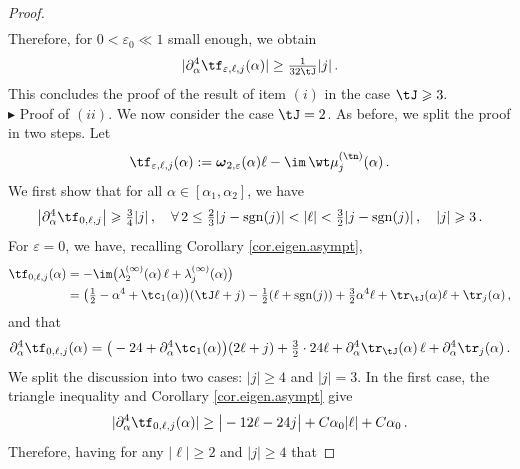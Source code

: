 \documentclass[a4paper,reqno,10pt]{article}
\newcommand{\pa}{\partial}
\newcommand{\bomega}{{\boldsymbol{\omega}}}
\begin{document}
\begin{proof}
\begin{align}
		\end{align}
	Therefore, for  $0< \varepsilon_{0} \ll 1$ small enough, we obtain 
    $$
    |\pa_{\alpha}^4\tf_{\varepsilon,\ell,j}(\alpha)|\geq\tfrac{1}{32 \tJ}|j| \,.
    $$
    This concludes the proof of the result of item $(i)$ in the case $\tJ\geqslant3.$
    \\[1mm]
    \noindent $\blacktriangleright$ {\sc Proof of $(ii)$.}
We now consider the case $\tJ=2$. As before, we split the proof in two steps. Let
\begin{equation}\label{fj-alpha-2}
     \tf_{\varepsilon,\ell,j}(\alpha) := \bomega_{2,\varepsilon}(\alpha) \ell -\im \, \wt\mu_{j}^{(\tn)}(\alpha) \,.
	\end{equation}
We first show that for all $\alpha\in [\alpha_{1},\alpha_{2}]$, we have
    \begin{equation}\label{transv.unpert-2}
        \big| \pa_{\alpha}^4 \tf_{0,\ell,j} \big| \geqslant \tfrac34  |j|
		\,, \quad  \forall \,2 \leq \tfrac23|j-{\rm{sgn}}(j)|< |\ell|< \tfrac32 |j-{\rm sgn}(j)|\,,\quad |j|\geqslant3 \,. 
	\end{equation}
For $\varepsilon=0$, we have, recalling Corollary \ref{cor.eigen.asympt},
	\begin{align}
			\tf_{0,\ell,j}(\alpha) & = -\im\big( \lambda_2^{(\infty)}(\alpha)\,\ell + \lambda_{j}^{(\infty)}(\alpha)\big) \\
			& =	\big(\tfrac12 - \alpha^4+\tc_{1}(\alpha) \big)(\tJ \ell + j) - \tfrac12 (\ell +{\rm sgn}(j) ) +\tfrac32 \alpha^4 \ell +  \tr_{\tJ}(\alpha) \ell + \tr_{j}(\alpha)		\,, \label{f-ooo}
	\end{align}
and that
\begin{equation}\label{der4.ooo}
	\pa_{\alpha}^4\tf_{0,\ell,j}(\alpha)
	=
	\big( -24 + \pa_{\alpha}^4\tc_{1}(\alpha) \big)(2\ell+j)
	+ \tfrac32 \cdot 24 \ell+\pa_{\alpha}^4 \tr_{\tJ}(\alpha)\,\ell
	+\pa_{\alpha}^4 \tr_{j}(\alpha)\,.
\end{equation}
We split the discussion into two cases: $|j|\geqslant 4$ and $|j|=3$. In the first case, the triangle inequality and Corollary \ref{cor.eigen.asympt} give
\begin{align}
    |\pa_{\alpha}^4\tf_{0,\ell,j}(\alpha)| \geq \big| - 12 \ell - 24 j \big| + C\alpha_{0} |\ell| + C \alpha_0 \,.
\end{align}
Therefore, having for any $|\ell|\geq 2$ and $|j|\geq 4$ that

\end{proof}
\end{document}
